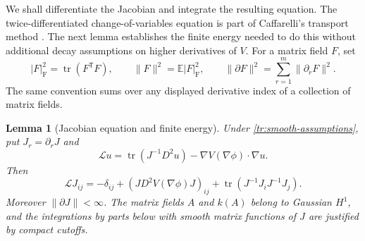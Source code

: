 \documentclass[11pt]{article}
\newtheorem{lemma}[theorem]{Lemma}
\theoremstyle{definition}
\theoremstyle{remark}
\numberwithin{equation}{section}
\begin{document}
We shall differentiate the Jacobian and integrate the resulting equation.
The twice-differentiated change-of-variables equation is part of
Caffarelli's transport method \cite[Section~5]{Caffarelli2000}.
The next lemma establishes the finite energy needed to do this without
additional decay assumptions on higher derivatives of $V$.
For a matrix field $F$, set
\[
 |F|_{\mathrm F}^2=\operatorname{tr}(F^{\mathsf T}F),\qquad
 \|F\|^2=\mathbb E|F|_{\mathrm F}^2,\qquad
 \|\partial F\|^2=\sum_{r=1}^m\|\partial_rF\|^2.
\]
The same convention sums over any displayed derivative index of a
collection of matrix fields.

\begin{lemma}[Jacobian equation and finite energy]\label{tr:energy}
Under \eqref{tr:smooth-assumptions}, put $J_r=\partial_rJ$ and
\[
 \mathcal L u=\operatorname{tr}(J^{-1}D^2u)
             -\nabla V(\nabla\phi)\cdot\nabla u.
\]
Then
\begin{equation}\label{tr:Jacobian-equation}
 \mathcal L J_{ij}
 =-\delta_{ij}+(JD^2V(\nabla\phi)J)_{ij}
   +\operatorname{tr}(J^{-1}J_iJ^{-1}J_j).
\end{equation}
Moreover $\|\partial J\|<\infty$.  The matrix fields $A$ and $k(A)$
belong to Gaussian $H^1$, and the integrations by parts below with
smooth matrix functions of $J$ are justified by compact cutoffs.
\end{lemma}
\end{document}
